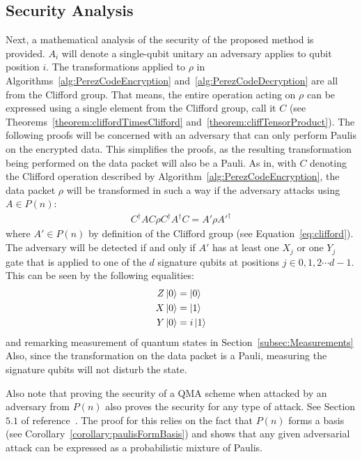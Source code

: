 \subsection{Security Analysis}
Next, a mathematical analysis of the security of the proposed method is provided. $A_i$ will denote a single-qubit unitary an adversary applies to qubit position $i$. The transformations applied to $\rho$ in Algorithms~\ref{alg:PerezCodeEncryption} and~\ref{alg:PerezCodeDecryption} are all from the Clifford group. That means, the entire operation acting on $\rho$ can be expressed using a single element from the Clifford group, call it $C$ (see Theorems~\ref{theorem:cliffordTimesClifford} and~\ref{theorem:cliffTensorProduct}). The following proofs will be concerned with an adversary that can only perform Paulis on the encrypted data. This simplifies the proofs, as the resulting transformation being performed on the data packet will also be a Pauli. As in, with $C$ denoting the Clifford operation described by Algorithm~\ref{alg:PerezCodeEncryption}, the data packet $\rho$ will be transformed in such a way if the adversary attacks using $A \in P(n)$: 
\begin{align}
C^{\dagger}AC \rho C^{\dagger}A^{\dagger}C = A' \rho A'^{\dagger}
\end{align}
where $A' \in P(n)$ by definition of the Clifford group (see Equation~\eqref{eq:clifford}). The adversary will be detected if and only if $A'$ has at least one $X_j$ or one $Y_j$ gate that is applied to one of the $d$ signature qubits at positions $j \in {0, 1, 2 \cdots d-1}$. This can be seen by the following equalities:
\begin{align}
Z\ket{0} &= \ket{0}\\
X\ket{0} &= \ket{1}\\
Y\ket{0} &= i\ket{1}
\end{align}
and remarking measurement of quantum states in Section~\ref{subsec:Measurements} Also, since the transformation on the data packet is a Pauli, measuring the signature qubits will not disturb the state.

Also note that proving the security of a QMA scheme when attacked by an adversary from $P(n)$ also proves the security for any type of attack. See Section $5.1$ of reference~\cite{broadbent2013quantum}. The proof for this relies on the fact that $P(n)$ forms a basis (see Corollary~\ref{corollary:paulisFormBasis}) and shows that any given adversarial attack can be expressed as a probabilistic mixture of Paulis.

